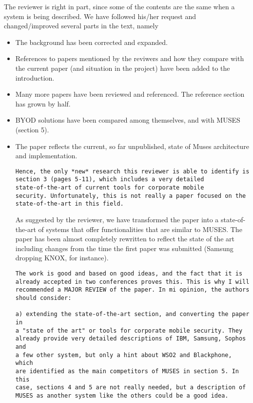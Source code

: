\documentclass[preprint]{elsarticle}
\begin{document}
{\begin{verbatim}
\end{verbatim}

The reviewer is right in part, since some of the contents are the same when a system is being described.
We have followed his/her request and changed/improved several parts in
the text, namely  \begin{itemize}
\item The background has been corrected and expanded.
\item References to papers mentioned by the reviwers and how they
  compare with the current paper (and situation in the project) have
  been added to the introduction.
\item Many more papers have been reviewed and referenced. The
  reference section has grown by half.
\item BYOD solutions have been compared among themselves, and with
  MUSES (section 5).
\item The paper reflects the current, so far unpublished, state of
  Muses architecture and implementation. 

\begin{verbatim}
Hence, the only *new* research this reviewer is able to identify is
section 3 (pages 5-11), which includes a very detailed
state-of-the-art of current tools for corporate mobile
security. Unfortunately, this is not really a paper focused on the
state-of-the-art in this field.
\end{verbatim}

As suggested by the reviewer, we have transformed the paper into a
state-of-the-art of systems that offer functionalities that are
similar to MUSES. The paper has been
almost completely rewritten to reflect the state of the art including
changes from the time the first paper was submitted (Samsung dropping
KNOX, for instance). 




\begin{verbatim}
The work is good and based on good ideas, and the fact that it is
already accepted in two conferences proves this. This is why I will
recommended a MAJOR REVIEW of the paper. In mi opinion, the authors
should consider: 

a) extending the state-of-the-art section, and converting the paper in
a "state of the art" or tools for corporate mobile security. They
already provide very detailed descriptions of IBM, Samsung, Sophos and
a few other system, but only a hint about WSO2 and Blackphone, which
are identified as the main competitors of MUSES in section 5. In this
case, sections 4 and 5 are not really needed, but a description of
MUSES as another system like the others could be a good idea. 
\end{verbatim}


\end{itemize}}
\end{document}

